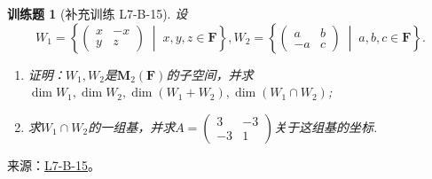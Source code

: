 \documentclass[UTF8,12pt,a4paper,fontset=fandol]{ctexart}
\newtheorem{exercise}{训练题}[section]
\begin{document}
\begin{exercise}[补充训练 L7-B-15]\label{prob:L7-B-15}
设\[W_1=\left\{\begin{pmatrix}
            x & -x \\ y & z
        \end{pmatrix} \;\middle|\; x,y,z\in \mathbf{F} \right\},W_2=\left\{\begin{pmatrix}
            a & b \\ -a & c
        \end{pmatrix} \;\middle|\; a,b,c\in \mathbf{F} \right\}.\]

        \begin{enumerate}
            \item 证明：$W_1,W_2$是$\mathbf{M}_2(\mathbf{F})$的子空间，并求$\dim W_1,\dim W_2,\dim(W_1+W_2),\dim(W_1\cap W_2)$;

            \item 求$W_1\cap W_2$的一组基，并求$A=\begin{pmatrix}
                        3 & -3 \\ -3 & 1
                    \end{pmatrix}$关于这组基的坐标.
        \end{enumerate}
\end{exercise}
\noindent 来源：\href{https://github.com/yhwu-is/Linear-Algebra-Left-Undone/blob/new/%E8%AE%B2%E4%B9%89/%E4%B8%93%E9%A2%98/7%20%E7%BA%BF%E6%80%A7%E6%98%A0%E5%B0%84%E7%9F%A9%E9%98%B5%E8%A1%A8%E7%A4%BA%E4%B8%8E%E7%9F%A9%E9%98%B5%E8%BF%90%E7%AE%97%E5%9F%BA%E7%A1%80.tex}{L7-B-15}。
\end{document}
